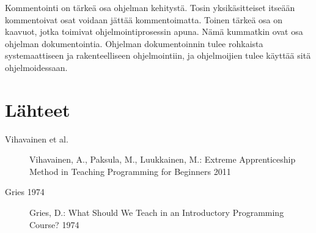 \documentclass[a4paper]{article}
\begin{document}
Kommentointi on tärkeä osa ohjelman kehitystä. Tosin yksikäsitteiset itseään kommentoivat osat voidaan jättää kommentoimatta. Toinen tärkeä osa on kaavuot, jotka toimivat ohjelmointiprosessin apuna. Nämä kummatkin ovat osa ohjelman dokumentointia. Ohjelman dokumentoinnin tulee rohkaista systemaattiseen ja rakenteelliseen ohjelmointiin, ja ohjelmoijien tulee käyttää sitä ohjelmoidessaan.


\newpage

\section{Lähteet}

\begin{description}
  \item [Vihavainen et al.] Vihavainen, A., Paksula, M., Luukkainen, M.: Extreme Apprenticeship Method in Teaching Programming for Beginners 2011
  \item [Gries 1974] Gries, D.: What Should We Teach in an Introductory Programming Course? 1974
\end{description}
\end{document}

